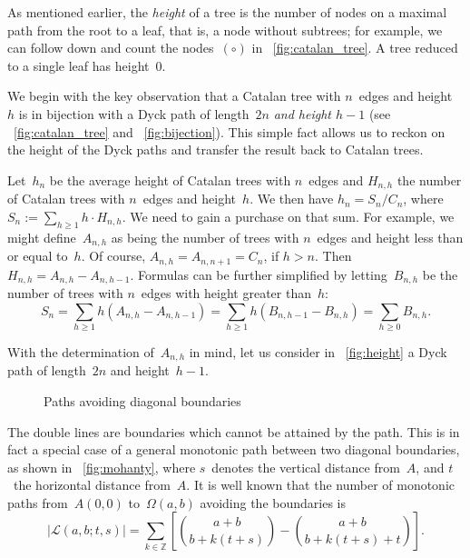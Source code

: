 As mentioned earlier, the \emph{height} of a tree is the number of
nodes on a maximal path from the root to a leaf, that is, a node
without subtrees; for example, we can follow down and count the
nodes~\((\circ)\) in \fig~\ref{fig:catalan_tree}. A tree reduced to a
single leaf has height~\(0\).

We begin with the key observation that a Catalan tree with \(n\)~edges
and height~\(h\) is in bijection with a Dyck path of length~\(2n\)
\emph{and height \(h-1\)} (see \fig~\vref{fig:catalan_tree} and
\fig~\ref{fig:bijection}). This simple fact allows us to reckon on the
height of the Dyck paths and transfer the result back to Catalan
trees.

Let~\(h_n\) be the average height of Catalan trees with \(n\)~edges
and \(H_{n,h}\) the number of Catalan trees with \(n\)~edges and
height~\(h\). We then have \(h_n = S_n/C_{n}\), where \(S_n := \sum_{h
  \geqslant 1} h \cdot H_{n,h}\). We need to gain a purchase on that
sum. For example, we might define~\(A_{n,h}\) as being the number of
trees with \(n\)~edges and height less than or equal to~\(h\). Of
course, \(A_{n,h} = A_{n,n+1} = C_{n}\), if \(h > n\). Then \(H_{n,h}
= A_{n,h}-A_{n,h-1}\). Formulas can be further simplified by
letting~\(B_{n,h}\) be the number of trees with \(n\)~edges with
height greater than~\(h\):
\begin{equation}
S_n = \sum_{h \geqslant 1}h(A_{n,h}-A_{n,h-1})
    = \sum_{h \geqslant 1}h(B_{n,h-1}-B_{n,h}) = \sum_{h\geqslant 0} B_{n,h}.
\label{eq:Sn}
\end{equation}

With the determination of~\(A_{n,h}\) in mind, let us consider in
\fig~\ref{fig:height} a Dyck path of length~\(2n\) and height~\(h-1\).
\begin{figure}[t]
\centering
{}
\quad
{}
\caption{Paths avoiding diagonal boundaries\label{fig:boundaries}}
\end{figure}
The double lines are boundaries which cannot be attained by the
path. This is in fact a special case of a general monotonic path
between two diagonal boundaries, as shown in \fig~\ref{fig:mohanty},
where \(s\)~denotes the vertical distance from~\(A\), and \(t\)~the
horizontal distance from~\(A\). It is well known that the number of
monotonic paths from~\(A(0,0)\) to~\(\Omega(a,b)\) avoiding the
boundaries is
\begin{equation}
\left\lvert\mathcal{L}(a,b;t,s)\right\rvert = \sum_{k \in \mathbb{Z}}\left[\binom{a+b}{b+k(t+s)} - \binom{a+b}{b+k(t+s)+t}\right].
\label{eq:mohanty}
\end{equation}

